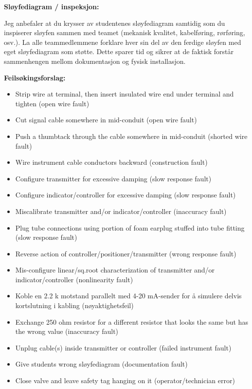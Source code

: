







\noindent
{\bf Sløyfediagram / inspeksjon:}

Jeg anbefaler at du krysser av studentenes sløyfediagram samtidig som du inspiserer sløyfen sammen med teamet (mekanisk kvalitet, kabelføring, rørføring, osv.). La alle teammedlemmene forklare hver sin del av den ferdige sløyfen med eget sløyfediagram som støtte. Dette sparer tid og sikrer at de faktisk forstår sammenhengen mellom dokumentasjon og fysisk installasjon.

\vskip 10pt

\goodbreak

\noindent
{\bf Feilsøkingsforslag:}

\begin{itemize}
\goodbreak
\item{} Strip wire at terminal, then insert insulated wire end under terminal and tighten (open wire fault)
\item{} Cut signal cable somewhere in mid-conduit (open wire fault)
\item{} Push a thumbtack through the cable somewhere in mid-conduit (shorted wire fault)
\item{} Wire instrument cable conductors backward (construction fault)
\item{} Configure transmitter for excessive damping (slow response fault)
\item{} Configure indicator/controller for excessive damping (slow response fault)
\item{} Miscalibrate transmitter and/or indicator/controller (inaccuracy fault)
\item{} Plug tube connections using portion of foam earplug stuffed into tube fitting (slow response fault)
\item{} Reverse action of controller/positioner/transmitter (wrong response fault)
\item{} Mis-configure linear/sq.root characterization of transmitter and/or indicator/controller (nonlinearity fault)
\item{} Koble en 2.2 k motstand parallelt med 4-20 mA-sender for å simulere delvis kortslutning i kabling (nøyaktighetsfeil)
\item{} Exchange 250 ohm resistor for a different resistor that looks the same but has the wrong value (inaccuracy fault) 
\item{} Unplug cable(s) inside transmitter or controller (failed instrument fault)
\item{} Give students wrong sløyfediagram (documentation fault)
\item{} Close valve and leave safety tag hanging on it (operator/technician error)
\end{itemize}







